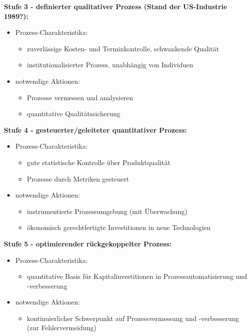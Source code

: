 \textbf{Stufe 3 - definierter qualitativer Prozess (Stand der US-Industrie 1989?):}
\begin{itemize}
	\item Prozess-Charakteristika:
	\begin{itemize}
		\item zuverlässige Kosten- und Terminkontrolle, schwankende Qualität
		\item institutionalisierter Prozess, unabhängig von Individuen
	\end{itemize}
	\item notwendige Aktionen:
	\begin{itemize}
		\item Prozesse vermessen und analysieren
		\item quantitative Qualitätssicherung
	\end{itemize}
\end{itemize}

\textbf{Stufe 4 - gesteuerter/geleiteter quantitativer Prozess:}
\begin{itemize}
	\item Prozess-Charakteristika:
	\begin{itemize}
		\item gute statistische Kontrolle über Produktqualität
		\item Prozesse durch Metriken gesteuert
	\end{itemize}
	\item notwendige Aktionen:
	\begin{itemize}
		\item instrumentierte Prozessumgebung (mit Überwachung)
		\item ökonomisch gerechtfertigte Investitionen in neue Technologien
	\end{itemize}
\end{itemize}

\textbf{Stufe 5 - optimierender rückgekoppelter Prozess:}
\begin{itemize}
	\item Prozess-Charakteristika:
	\begin{itemize}
		\item quantitative Basis für Kapitalinvestitionen in Prozessautomatisierung und -verbesserung
	\end{itemize}
	\item notwendige Aktionen:
	\begin{itemize}
		\item kontinuierlicher Schwerpunkt auf Prozessvermessung und -verbesserung (zur Fehlervermeidung)
	\end{itemize}
\end{itemize}

